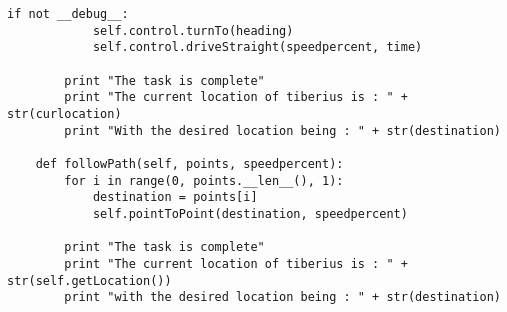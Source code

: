 \begin{lstlisting}[style=custompython, label=Algorithms-code, caption=full code for the Algorithms class]
        if not __debug__:
            self.control.turnTo(heading)
            self.control.driveStraight(speedpercent, time)

        print "The task is complete"
        print "The current location of tiberius is : " + str(curlocation)
        print "With the desired location being : " + str(destination)

    def followPath(self, points, speedpercent):
        for i in range(0, points.__len__(), 1):
            destination = points[i]
            self.pointToPoint(destination, speedpercent)

        print "The task is complete"
        print "The current location of tiberius is : " + str(self.getLocation())
        print "with the desired location being : " + str(destination)
\end{lstlisting}
